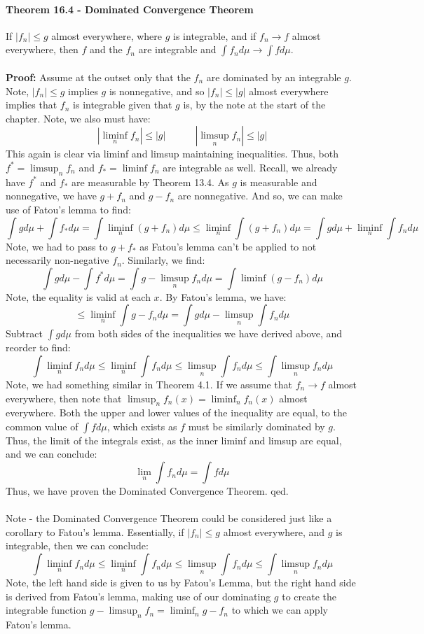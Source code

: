 \documentclass[12pt,a4paper]{article}
\newcommand{\1}[1]{\mathbbm{1}\left\{ #1 \right\}}
\begin{document}
\paragraph{Theorem 16.4 - Dominated Convergence Theorem} If $|f_n| \leq g$ almost everywhere, where $g$ is integrable, and if $f_n \to f$ almost everywhere, then $f$ and the $f_n$ are integrable and $\int f_n d\mu \to \int f d\mu$.
\\\\
\textbf{Proof:} Assume at the outset only that the $f_n$ are dominated by an integrable $g$. Note, $|f_n| \leq g$ implies $g$ is nonnegative, and so $|f_n| \leq |g|$ almost everywhere implies that $f_n$ is integrable given that $g$ is, by the note at the start of the chapter. Note, we also must have:
$$
	|\liminf_n f_n| \leq |g|
	\quad\quad\quad
	|\limsup_n f_n| \leq |g|
$$
This again is clear via liminf and limsup maintaining inequalities. Thus, both $f^* = \limsup_n f_n$ and $f_* = \liminf f_n$ are integrable as well. Recall, we already have $f^*$ and $f_*$ are measurable by Theorem 13.4. As $g$ is measurable and nonnegative, we have $g + f_n$ and $g - f_n$ are nonnegative. And so, we can make use of Fatou's lemma to find:
$$
	\int g d\mu + \int f_* d\mu = \int \liminf_n (g + f_n) d\mu 
	\leq
	\liminf_n \int (g + f_n) d\mu = \int g d\mu + \liminf_n \int f_n d\mu
$$
Note, we had to pass to $g + f_*$ as Fatou's lemma can't be applied to not necessarily non-negative $f_n$. Similarly, we find:
$$
	\int g d\mu - \int f^* d\mu = \int g - \limsup_n f_n d\mu =
	\int \liminf (g - f_n) d\mu
$$
Note, the equality is valid at each $x$. By Fatou's lemma, we have:
$$
	\leq \liminf_n \int g - f_n d\mu = \int g d\mu - \limsup_n \int f_n d\mu
$$
Subtract $\int g d\mu$ from both sides of the inequalities we have derived above, and reorder to find:
$$
	\int \liminf_n f_n d\mu \leq
	\liminf_n \int f_n d\mu \leq
	\limsup_n \int f_n d\mu \leq
	\int \limsup_n f_n d\mu
$$
Note, we had something similar in Theorem 4.1. If we assume that $f_n \to f$ almost everywhere, then note that $\limsup_n f_n(x) = \liminf_n f_n(x)$ almost everywhere. Both the upper and lower values of the inequality are equal, to the common value of $\int f d\mu$, which exists as $f$ must be similarly dominated by $g$. Thus, the limit of the integrals exist, as the inner liminf and limsup are equal, and we can conclude:
$$
	\lim_n \int f_n d\mu = \int f d\mu
$$
Thus, we have proven the Dominated Convergence Theorem. qed.
\\\\
Note - the Dominated Convergence Theorem could be considered just like a corollary to Fatou's lemma. Essentially, if $|f_n| \leq g$ almost everywhere, and $g$ is integrable, then we can conclude:
$$
	\int \liminf_n f_n d\mu \leq
	\liminf_n \int f_n d\mu \leq
	\limsup_n \int f_n d\mu \leq
	\int \limsup_n f_n d\mu
$$
Note, the left hand side is given to us by Fatou's Lemma, but the right hand side is derived from Fatou's lemma, making use of our dominating $g$ to create the integrable function $g - \limsup_n f_n = \liminf_n g - f_n$ to which we can apply Fatou's lemma.
\end{document}
